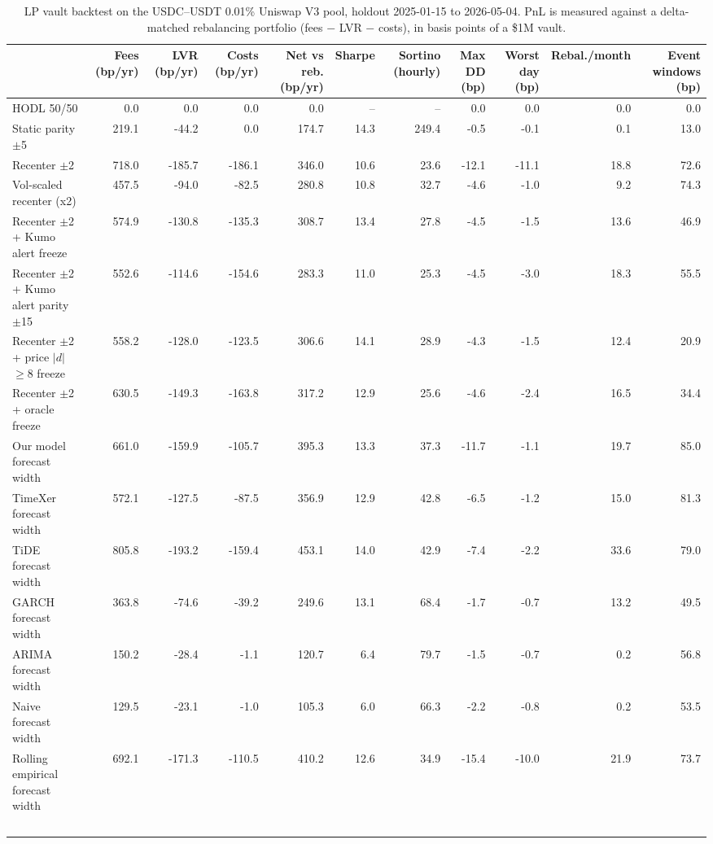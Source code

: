 \begin{table}
\caption{LP vault backtest on the USDC--USDT 0.01\% Uniswap V3 pool, holdout 2025-01-15 to 2026-05-04. PnL is measured against a delta-matched rebalancing portfolio (fees $-$ LVR $-$ costs), in basis points of a \$1M vault.}
\label{tab:lp_backtest}
\begin{tabular}{lrrrrrrrrrr}
\toprule
 & Fees (bp/yr) & LVR (bp/yr) & Costs (bp/yr) & Net vs reb. (bp/yr) & Sharpe & Sortino (hourly) & Max DD (bp) & Worst day (bp) & Rebal./month & Event windows (bp) \\
\midrule
HODL 50/50 & 0.0 & 0.0 & 0.0 & 0.0 & -- & -- & 0.0 & 0.0 & 0.0 & 0.0 \\
Static parity $\pm$5 & 219.1 & -44.2 & 0.0 & 174.7 & 14.3 & 249.4 & -0.5 & -0.1 & 0.1 & 13.0 \\
Recenter $\pm$2 & 718.0 & -185.7 & -186.1 & 346.0 & 10.6 & 23.6 & -12.1 & -11.1 & 18.8 & 72.6 \\
Vol-scaled recenter (x2) & 457.5 & -94.0 & -82.5 & 280.8 & 10.8 & 32.7 & -4.6 & -1.0 & 9.2 & 74.3 \\
Recenter $\pm$2 + Kumo alert freeze & 574.9 & -130.8 & -135.3 & 308.7 & 13.4 & 27.8 & -4.5 & -1.5 & 13.6 & 46.9 \\
Recenter $\pm$2 + Kumo alert parity $\pm$15 & 552.6 & -114.6 & -154.6 & 283.3 & 11.0 & 25.3 & -4.5 & -3.0 & 18.3 & 55.5 \\
Recenter $\pm$2 + price $|d|$$\geq$8 freeze & 558.2 & -128.0 & -123.5 & 306.6 & 14.1 & 28.9 & -4.3 & -1.5 & 12.4 & 20.9 \\
Recenter $\pm$2 + oracle freeze & 630.5 & -149.3 & -163.8 & 317.2 & 12.9 & 25.6 & -4.6 & -2.4 & 16.5 & 34.4 \\
Our model forecast width & 661.0 & -159.9 & -105.7 & 395.3 & 13.3 & 37.3 & -11.7 & -1.1 & 19.7 & 85.0 \\
TimeXer forecast width & 572.1 & -127.5 & -87.5 & 356.9 & 12.9 & 42.8 & -6.5 & -1.2 & 15.0 & 81.3 \\
TiDE forecast width & 805.8 & -193.2 & -159.4 & 453.1 & 14.0 & 42.9 & -7.4 & -2.2 & 33.6 & 79.0 \\
GARCH forecast width & 363.8 & -74.6 & -39.2 & 249.6 & 13.1 & 68.4 & -1.7 & -0.7 & 13.2 & 49.5 \\
ARIMA forecast width & 150.2 & -28.4 & -1.1 & 120.7 & 6.4 & 79.7 & -1.5 & -0.7 & 0.2 & 56.8 \\
Naive forecast width & 129.5 & -23.1 & -1.0 & 105.3 & 6.0 & 66.3 & -2.2 & -0.8 & 0.2 & 53.5 \\
Rolling empirical forecast width & 692.1 & -171.3 & -110.5 & 410.2 & 12.6 & 34.9 & -15.4 & -10.0 & 21.9 & 73.7 \\
$$
\end{tabular}
\end{table}
